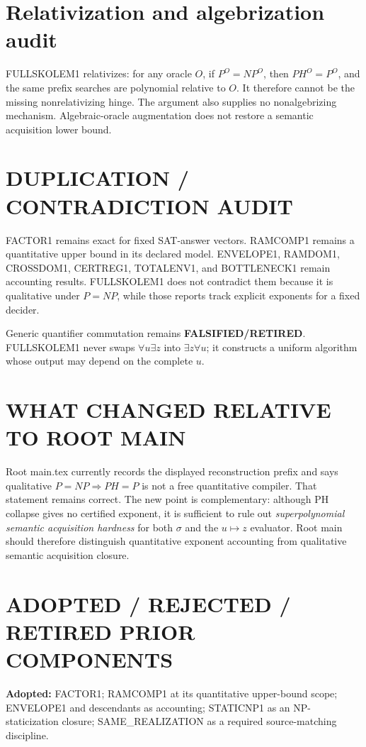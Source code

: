 \documentclass[11pt]{article}
\begin{document}
\section*{Relativization and algebrization audit}
FULLSKOLEM1 relativizes: for any oracle \(O\), if \(P^O=NP^O\), then \(PH^O=P^O\), and the same prefix searches are polynomial relative to \(O\). It therefore cannot be the missing nonrelativizing hinge. The argument also supplies no nonalgebrizing mechanism. Algebraic-oracle augmentation does not restore a semantic acquisition lower bound.

\section*{DUPLICATION / CONTRADICTION AUDIT}
FACTOR1 remains exact for fixed SAT-answer vectors. RAMCOMP1 remains a quantitative upper bound in its declared model. ENVELOPE1, RAMDOM1, CROSSDOM1, CERTREG1, TOTALENV1, and BOTTLENECK1 remain accounting results. FULLSKOLEM1 does not contradict them because it is qualitative under \(P=NP\), while those reports track explicit exponents for a fixed decider.

Generic quantifier commutation remains \textbf{FALSIFIED/RETIRED}. FULLSKOLEM1 never swaps \(\forall u\exists z\) into \(\exists z\forall u\); it constructs a uniform algorithm whose output may depend on the complete \(u\).

\section*{WHAT CHANGED RELATIVE TO ROOT MAIN}
Root main.tex currently records the displayed reconstruction prefix and says qualitative \(P=NP\Rightarrow PH=P\) is not a free quantitative compiler. That statement remains correct. The new point is complementary: although PH collapse gives no certified exponent, it is sufficient to rule out \emph{superpolynomial semantic acquisition hardness} for both \(\sigma\) and the \(u\mapsto z\) evaluator. Root main should therefore distinguish quantitative exponent accounting from qualitative semantic acquisition closure.

\section*{ADOPTED / REJECTED / RETIRED PRIOR COMPONENTS}
\textbf{Adopted:} FACTOR1; RAMCOMP1 at its quantitative upper-bound scope; ENVELOPE1 and descendants as accounting; STATICNP1 as an NP-staticization closure; SAME\_REALIZATION as a required source-matching discipline.
\end{document}
